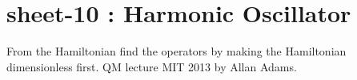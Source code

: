 \chapter{sheet-10 : Harmonic Oscillator}

From the Hamiltonian find the operators by making the Hamiltonian dimensionless first. QM lecture MIT 2013 by Allan Adams.